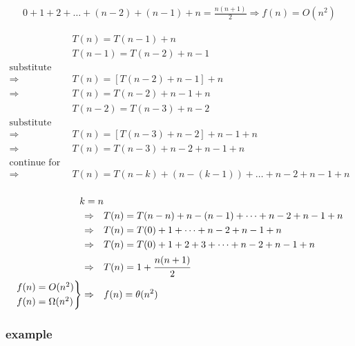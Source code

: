 \documentclass[12pt]{article}
\begin{document}
\begin{align*}
0 + 1 + 2 + \dots + (n-2) + (n-1) + n = \frac{n(n+1)}{2} \Rightarrow f(n) = O(n^{2})
\end{align*}






\begin{align*}
&T(n) = T(n-1) + n \\
&T(n-1) = T(n-2) + n-1 \\
\text{substitute}& \\
\Rightarrow \quad &T(n) = \left[ T(n-2) + n-1 \right] + n \\
\Rightarrow \quad &T(n) =  T(n-2) + n-1 + n  \\
&T(n-2) = T(n-3) + n-2 \\
\text{substitute} \\
\Rightarrow \quad &T(n) = [ T(n-3) + n-2 ] + n-1 + n \\
\Rightarrow \quad &T(n) =  T(n-3) + n-2 + n-1 + n \\
\text{continue for k times}& \\
\Rightarrow \quad &T(n) =  T(n-k) + (n-(k-1)) + \dots  + n-2 + n-1 + n \\
\end{align*}



\begin{align*}
k = n \\
\Rightarrow \quad &T(n) = T(n-n) + n-(n-1) + \dots  + n-2 + n-1 + n \\
\Rightarrow \quad &T(n) = T(0) + 1 + \dots  + n-2 + n-1 + n \\
\Rightarrow \quad &T(n) = T(0) + 1 + 2 + 3 + \dots  + n-2 + n-1 + n \\
\Rightarrow \quad &T(n) = 1 + \cfrac{n(n+1)}{2} \\
\begin{rcases}
&f(n) = O(n^{2}) \\
&f(n) = \Omega(n^{2}) 
\end{rcases}
\Rightarrow \quad &f(n) = \theta(n^{2}) 
\end{align*}






\subsubsection{example}
\end{document}
